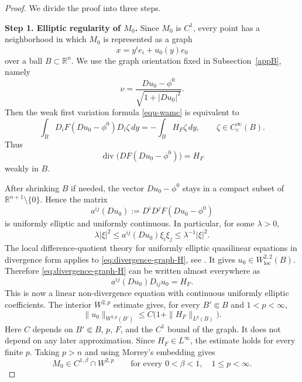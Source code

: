 \documentclass[10pt,a4paper]{amsart}
\numberwithin{equation}{section}
\begin{document}
\begin{proof}
We divide the proof into three steps.

\medskip
\noindent
\textbf{Step 1. Elliptic regularity of $M_0$.}
Since $M_0$ is $C^1$, every point has a neighborhood in which $M_0$
is represented as a graph
\begin{equation*}
 x=y^ie_i+u_0(y)e_0
\end{equation*}
over a ball $B\subset\mathbb R^n$. We use the graph orientation fixed in Subsection~\ref{appB}, namely
\begin{equation*}
 \nu=\frac{Du_0-\phi^0}{\sqrt{1+|Du_0|^2}}.
\end{equation*}
Then the weak first variation formula \eqref{equ-wamc} is equivalent to
\begin{equation*}
 \int_B D_iF(Du_0-\phi^0)D_i\zeta\,dy
 =-\int_B H_F\zeta\,dy,
 \qquad \zeta\in C_c^\infty(B).
\end{equation*}
Thus
\begin{equation}
\label{eq:divergence-graph-H}
 \operatorname{div}\big(DF(Du_0-\phi^0)\big)=H_F
\end{equation}
weakly in $B$.

After shrinking $B$ if needed, the vector $Du_0-\phi^0$ stays in a compact subset of
$\mathbb R^{n+1}\setminus\{0\}$. Hence the matrix
\begin{equation*}
 a^{ij}(Du_0):=D^iD^jF(Du_0-\phi^0)
\end{equation*}
is uniformly elliptic and uniformly continuous. In particular, for some $\lambda>0$,
\begin{equation*}
 \lambda |\xi|^2\leq a^{ij}(Du_0)\xi_i\xi_j\leq \lambda^{-1}|\xi|^2.
\end{equation*}
The local difference-quotient theory for uniformly elliptic quasilinear equations in divergence form applies to \eqref{eq:divergence-graph-H}, see \cite[Chapter IV]{LU68}. It gives $u_0\in W_{\mathrm{loc}}^{2,2}(B)$. Therefore \eqref{eq:divergence-graph-H} can be written almost everywhere as
\begin{equation*}
 a^{ij}(Du_0)D_{ij}u_0=H_F.
\end{equation*}
This is now a linear non-divergence equation with continuous uniformly elliptic coefficients. The interior $W^{2,p}$ estimate \cite[Theorem 9.11]{GT01} gives, for every $B'\Subset B$ and $1<p<\infty$,
\begin{equation*}
 \|u_0\|_{W^{2,p}(B')}
 \leq C\bigl(1+\|H_F\|_{L^p(B)}\bigr).
\end{equation*}
Here $C$ depends on $B'\Subset B$, $p$, $F$, and the $C^1$ bound of the graph. It does not depend on any later approximation. Since $H_F\in L^\infty$, the estimate holds for every finite $p$. Taking $p>n$ and using Morrey's embedding gives
\begin{equation}
\label{eq:initial-regularity}
 M_0\in C^{1,\beta}\cap W^{2,p}
 \qquad\text{for every }0<\beta<1,\quad 1\leq p<\infty.
\end{equation}


\end{proof}
\end{document}
